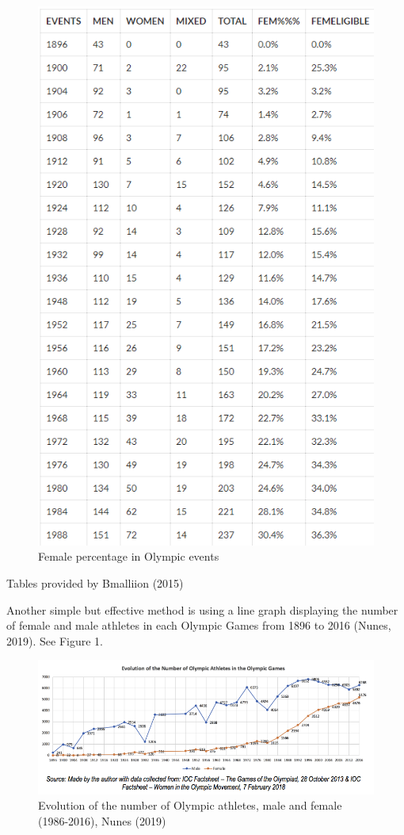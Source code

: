 \documentclass[12pt]{article}
\begin{document}
\begin{table}[!hb]
\begin{subfigure}[t]{2.5in}
    \includegraphics[scale=0.3]{pics/1-2.png}
    \caption{Female percentage in Olympic events}\label{fig:1b}
  \end{subfigure}
  \caption{Tables provided by Bmalliion (2015)}\label{fig:1}
\end{table}

Another simple but effective method is using a line graph displaying the number of female and male athletes in each Olympic Games from 1896 to 2016 (Nunes, 2019). See Figure 1. 

\begin{figure}
    \centering
    \includegraphics[trim={0 3.5cm 0 0},clip, scale=0.7]{pics/1-3.png}
    \caption{Evolution of the number of Olympic athletes, male and female (1986-2016), Nunes (2019)}
    \label{fig:my_label}
\end{figure}
\end{document}
